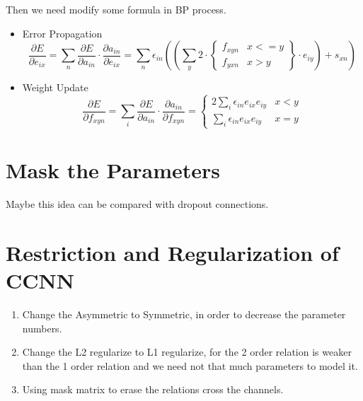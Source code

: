 \documentclass[12pt]{article}
\begin{document}
Then we need modify some formula in BP process.
\begin{itemize}
    \item Error Propagation
    \begin{equation}
    \frac{\partial E}{\partial e_{ix}} = \sum_n \frac{\partial E}{\partial a_{in}} \cdot \frac{\partial a_{in}}{\partial e_{ix}} = \sum_n  \epsilon_{in} ((\sum_y 2 \cdot
    \left \{
        \begin{array}{ll}
        f_{xyn} & x<=y \\
        f_{yxn} & x>y
        \end{array}
    \right \}
    \cdot e_{iy}) + s_{xn})
    \end{equation}

    \item Weight Update
    \begin{equation}
    \frac{\partial E}{\partial f_{xyn}} = \sum_i \frac{\partial E}{\partial a_{in}} \cdot \frac{\partial a_{in}}{\partial f_{xyn}} =
    \left \{
        \begin{array}{ll}
        2 \sum_i  \epsilon_{in} e_{ix} e_{iy} & x<y \\
        \sum_i  \epsilon_{in} e_{ix} e_{iy} & x=y
        \end{array}
    \right .
    \end{equation}

\end{itemize}

\section{Mask the Parameters}
Maybe this idea can be compared with dropout connections.

\section{Restriction and Regularization of CCNN}
\begin{enumerate}
    \item Change the Asymmetric to Symmetric, in order to decrease the parameter numbers.
    \item Change the L2 regularize to L1 regularize, for the 2 order relation is weaker than the 1 order relation and we need not that much parameters to model it.
    \item Using mask matrix to erase the relations cross the channels.
\end{enumerate}
\end{document}
